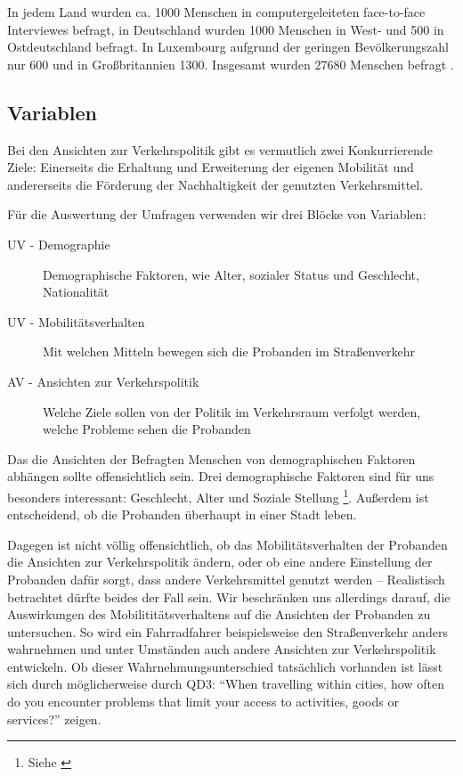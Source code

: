 In jedem Land wurden ca. 1000 Menschen in computergeleiteten face-to-face Interviewes befragt, in Deutschland wurden 1000 Menschen in West- und 500 in Ostdeutschland befragt. In Luxembourg aufgrund der geringen Bevölkerungszahl nur 600 und in Großbritannien 1300. Insgesamt wurden 27680 Menschen befragt \parencite{eceuropaeu}.

\subsection{Variablen}

Bei den Ansichten zur Verkehrspolitik gibt es vermutlich zwei Konkurrierende Ziele: Einerseits die Erhaltung und Erweiterung der eigenen Mobilität und andererseits die Förderung der Nachhaltigkeit der genutzten Verkehrsmittel.

Für die Auswertung der Umfragen verwenden wir drei Blöcke von Variablen:
\begin{description}
	\item[UV - Demographie] Demographische Faktoren, wie Alter, sozialer Status und Geschlecht, Nationalität
	\item[UV - Mobilitätsverhalten] Mit welchen Mitteln bewegen sich die Probanden im Straßenverkehr
	\item[AV - Ansichten zur Verkehrspolitik] Welche Ziele sollen von der Politik im Verkehrsraum verfolgt werden, welche Probleme sehen die Probanden
\end{description}
Das die Ansichten der Befragten Menschen von demographischen Faktoren abhängen sollte offensichtlich sein.
Drei demographische Faktoren sind für uns besonders interessant: Geschlecht, Alter und Soziale Stellung \footnote{Siehe \cite[33 ff.]{widmer}}.
Außerdem ist entscheidend, ob die Probanden überhaupt in einer Stadt leben.

Dagegen ist nicht völlig offensichtlich, ob das Mobilitätsverhalten der Probanden die Ansichten zur Verkehrspolitik ändern, oder ob eine andere Einstellung der Probanden dafür sorgt, dass andere Verkehrsmittel genutzt werden – Realistisch betrachtet dürfte beides der Fall sein.
Wir beschränken uns allerdings darauf, die Auswirkungen des Mobilititätsverhaltens auf die Ansichten der Probanden zu untersuchen.
So wird ein Fahrradfahrer beispielsweise den Straßenverkehr anders wahrnehmen und unter Umständen auch andere Ansichten zur Verkehrspolitik entwickeln.
Ob dieser Wahrnehmungsunterschied tatsächlich vorhanden ist lässt sich durch möglicherweise durch QD3: \enquote{When travelling within cities, how often do you encounter problems that limit your access to activities, goods or services?} zeigen.


